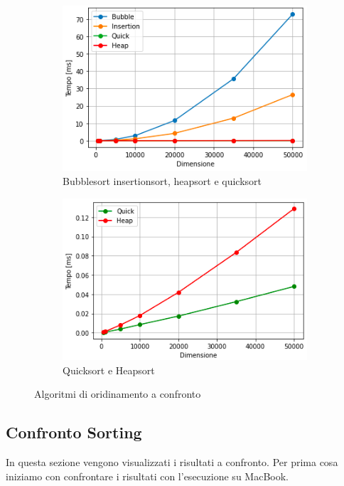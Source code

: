 \documentclass[12pt, a4paper]{report}
\begin{document}
\begin{figure}[ht]
 \centering
 \begin{subfigure}[t]{0.45\textwidth}
 \centering
 \includegraphics[width=\textwidth]{Img/GraficiSorting/Sorting1.png}
 \caption{Bubblesort insertionsort, heapsort e quicksort}
 \label{Fig:AllSortingAlg}
 \end{subfigure}
 \hfill
 \begin{subfigure}[t]{0.45\textwidth}
 \centering
 \includegraphics[width=\textwidth]{Img/GraficiSorting/Sorting2.png}
 \caption{Quicksort e Heapsort}
 \label{Fig:QHSort}
 \end{subfigure}

 \caption{Algoritmi di oridinamento a confronto}
 \label{Fig:AllSort}
\end{figure}


\subsection{Confronto Sorting}
In questa sezione vengono visualizzati i risultati a confronto. Per prima cosa iniziamo con confrontare i risultati con l'esecuzione su MacBook.
\end{document}
